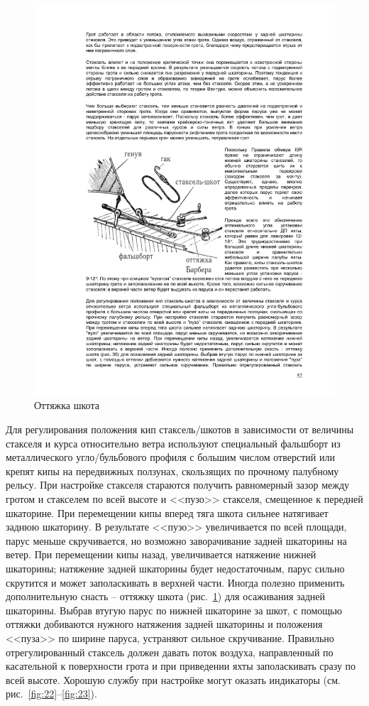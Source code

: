 \documentclass[a4paper, 12pt, twoside, final, book, russian, fittopage, cyremdash]{ncc}
\newcommand{\ris}[1]{\ref{fig:#1}}
\begin{document}
\begin{figure}[htb]
  \centering
  \includegraphics[scale=1]{0030}
  \caption{Оттяжка шкота}
  \label{fig:30}
\end{figure}

Для регулирования положения кип стаксель\-/шкотов в зависимости от величины стакселя и курса относительно ветра используют специальный фальшборт из металлического угло\-/бульбового профиля с большим числом отверстий или крепят кипы на передвижных ползунах, скользящих по прочному палубному рельсу. При настройке стакселя стараются получить равномерный зазор между гротом и стакселем по всей высоте и <<пузо>> стакселя, смещенное к передней шкаторине. При перемещении кипы вперед тяга шкота сильнее натягивает заднюю шкаторину. В результате <<пузо>> увеличивается по всей площади, парус меньше скручивается, но возможно заворачивание задней шкаторины на ветер. При перемещении кипы назад, увеличивается натяжение нижней шкаторины; натяжение задней шкаторины будет недостаточным, парус сильно скрутится и может заполаскивать в верхней части. Иногда полезно применить дополнительную снасть \--- оттяжку шкота (рис.~\ris{30}) для осаживания задней шкаторины. Выбрав втугую парус по нижней шкаторине за шкот, с помощью оттяжки добиваются нужного натяжения задней шкаторины и положения <<пуза>> по ширине паруса, устраняют сильное скручивание. Правильно отрегулированный стаксель должен давать поток воздуха, направленный по касательной к поверхности грота и при приведении яхты заполаскивать сразу по всей высоте. Хорошую службу при настройке могут оказать индикаторы (см. рис.~\ris{22}--\ris{23}).
\end{document}
